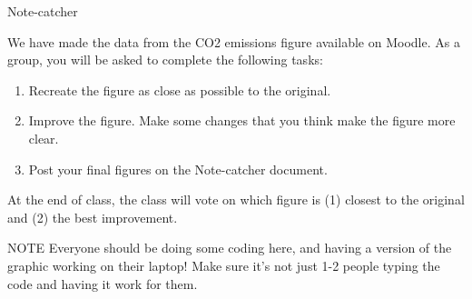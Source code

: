 \documentclass[table]{beamer}\usepackage[]{graphicx}\usepackage[]{color}
\begin{document}


\begin{frame}[fragile]{Note-catcher}

We have made the data from the CO2 emissions figure available on Moodle. As a group, you will be asked to complete the following tasks:

\begin{enumerate}
    \item Recreate the figure as close as possible to the original.
    \item Improve the figure. Make some changes that you think make the figure more clear.
    \item Post your final figures on the Note-catcher document.
\end{enumerate}

At the end of class, the class will vote on which figure is (1) closest to the original and (2) the best improvement.

\begin{block}{NOTE}
Everyone should be doing some coding here, and having a version of the graphic working on their laptop! Make sure it's not just 1-2 people typing the code and having it work for them.
\end{block}

\end{frame}
\end{document}
